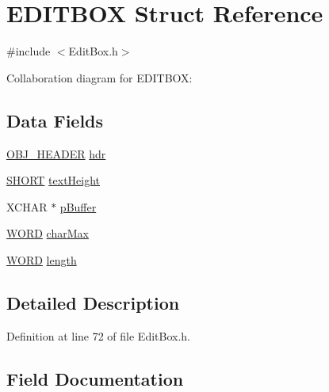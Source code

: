 \hypertarget{struct_e_d_i_t_b_o_x}{}\section{E\+D\+I\+T\+B\+O\+X Struct Reference}
\label{struct_e_d_i_t_b_o_x}


{\ttfamily \#include $<$Edit\+Box.\+h$>$}



Collaboration diagram for E\+D\+I\+T\+B\+O\+X\+:
\subsection*{Data Fields}
\begin{DoxyCompactItemize}
\item 
\hyperlink{struct_o_b_j___h_e_a_d_e_r}{O\+B\+J\+\_\+\+H\+E\+A\+D\+E\+R} \hyperlink{struct_e_d_i_t_b_o_x_abeffaf353197a8a64fba6707b68ce0be}{hdr}
\item 
\hyperlink{_generic_type_defs_8h_ae9bb25d3afecf3bfab0fbe3c22c2050f}{S\+H\+O\+R\+T} \hyperlink{struct_e_d_i_t_b_o_x_a40fa9c35391b0005032180b85e7afd34}{text\+Height}
\item 
X\+C\+H\+A\+R $\ast$ \hyperlink{struct_e_d_i_t_b_o_x_a7f974d9e1124eb06338cad8c815a4fec}{p\+Buffer}
\item 
\hyperlink{_generic_type_defs_8h_a2b0e863dadf920709ec53d9088ee7c91}{W\+O\+R\+D} \hyperlink{struct_e_d_i_t_b_o_x_a784b87b4a682a1bf98cb5d274c61fa80}{char\+Max}
\item 
\hyperlink{_generic_type_defs_8h_a2b0e863dadf920709ec53d9088ee7c91}{W\+O\+R\+D} \hyperlink{struct_e_d_i_t_b_o_x_ac03f72dfd2e32790101f1221796ea289}{length}
\end{DoxyCompactItemize}


\subsection{Detailed Description}


Definition at line 72 of file Edit\+Box.\+h.



\subsection{Field Documentation}
\hypertarget{struct_e_d_i_t_b_o_x_a784b87b4a682a1bf98cb5d274c61fa80}{}
